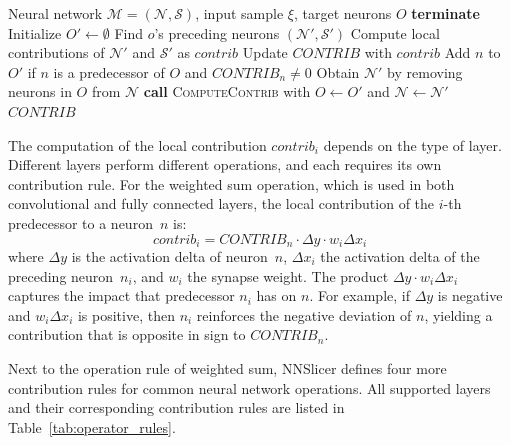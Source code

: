 \documentclass[
12pt,
fancyheadings,
a4paper,
twoside,
BCOR=0.7cm,
nobcorignoretitle,
grayscalebody,
]{stsreprt}
\begin{document}
\begin{algorithm}[ht]
\caption{ComputeContrib~\cite{zhang2020dynamic}: computing the contributions of neurons and synapses for an input sample}\label{alg:compute_contrib}
\begin{algorithmic}[1]
\Require Neural network $\mathcal{M} = (\mathcal{N}, \mathcal{S})$, input sample $\xi$, target neurons $O$
    \State \textbf{terminate}
\EndIf
\State Initialize $O' \gets \emptyset$
    \State Find $o$'s preceding neurons $(\mathcal{N}', \mathcal{S}')$
    \State Compute local contributions of $\mathcal{N}'$ and $\mathcal{S}'$ as $\textit{contrib}$
    \State Update $\textit{CONTRIB}$ with $\textit{contrib}$
\EndFor
{}
    \State Add $n$ to $O'$ if $n$ is a predecessor of $O$ and $\textit{CONTRIB}_n \neq 0$
\EndFor
\State Obtain $\mathcal{N}'$ by removing neurons in $O$ from $\mathcal{N}$
\State \textbf{call} \textsc{ComputeContrib} with $O \gets O'$ and $\mathcal{N} \gets \mathcal{N}'$
\State \Return $\textit{CONTRIB}$
\end{algorithmic}
\end{algorithm}

\noindent The computation of the local contribution $\textit{contrib}_i$ depends on the type of layer.
Different layers perform different operations, and each requires its own contribution rule.
For the weighted sum operation, which is used in both convolutional and fully connected layers, the
local contribution of the $i$-th predecessor to a neuron~$n$ is:
\begin{equation}
    \textit{contrib}_i = \textit{CONTRIB}_n \cdot \Delta y \cdot w_i \Delta x_i
\end{equation}
where $\Delta y$ is the activation delta of neuron~$n$, $\Delta x_i$ the activation delta of the
preceding neuron~$n_i$, and $w_i$ the synapse weight.
The product $\Delta y \cdot w_i \Delta x_i$ captures the impact that predecessor $n_i$ has on $n$.
For example, if $\Delta y$ is negative and $w_i \Delta x_i$ is positive, then $n_i$ reinforces the
negative deviation of $n$, yielding a contribution that is opposite in sign to
$\textit{CONTRIB}_n$.

Next to the operation rule of weighted sum, NNSlicer defines four more contribution rules for
common neural network operations. 
All supported layers and their corresponding contribution rules are listed in
Table~\ref{tab:operator_rules}.
\end{document}
